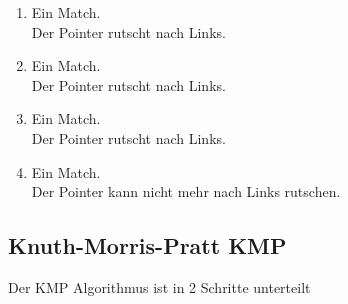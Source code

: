 \documentclass[a4paper,10pt]{report}
\begin{document}
\begin{enumerate}
	\item
		Ein Match.\\
		Der Pointer rutscht nach Links.\\
	\item
		Ein Match.\\
		Der Pointer rutscht nach Links.\\
	\item
		Ein Match.\\
		Der Pointer rutscht nach Links.\\
	\item
		Ein Match.\\
		Der Pointer kann nicht mehr nach Links rutschen.\\
\end{enumerate}
\newpage
\subsection{Knuth-Morris-Pratt KMP}
Der KMP Algorithmus ist in 2 Schritte unterteilt
\end{document}
